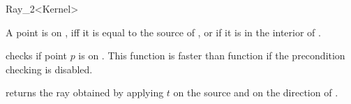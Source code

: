 \begin{ccRefClass}{Ray_2<Kernel>}
       {}
\ccGlue
{}
       {}

       {A point is on \ccVar, iff it is equal to the source
        of \ccVar, or if it is in the interior of \ccVar.}

       {checks if point $p$ is on \ccVar. This function is faster
        than function  if the precondition 
	checking is disabled.
        }


       {returns the ray obtained by applying $t$ on the source
        and on the direction of \ccVar.}

\ccSeeAlso
{}

\end{ccRefClass} 
